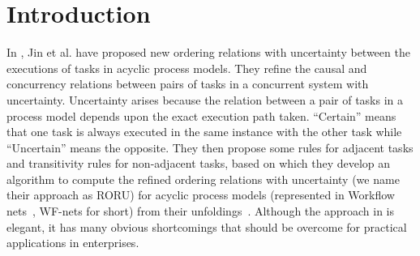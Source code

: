 \documentclass{llncs}
\begin{document}
\section{Introduction}\label{sec:introduction}

In \cite{jin2014computing}, Jin et al. have proposed new ordering relations with uncertainty between the executions of tasks in acyclic process models. They refine the causal and concurrency relations between pairs of tasks in a concurrent system with uncertainty. Uncertainty arises because the relation between a pair of tasks in a process model depends upon the exact execution path taken. ``Certain'' means that one task is always executed in the same instance with the other task while ``Uncertain'' means the opposite. They then propose some rules for adjacent tasks and transitivity rules for non-adjacent tasks, based on which they develop an algorithm to compute the refined ordering relations with uncertainty (we name their approach as RORU) for acyclic process models (represented in Workflow nets~\cite{van1998application}, WF-nets for short) from their unfoldings~\cite{mcmillan1995technique,esparza2002improvement}. Although the approach in \cite{jin2014computing} is elegant, it has many obvious shortcomings that should be overcome for practical applications in enterprises.
\end{document}
